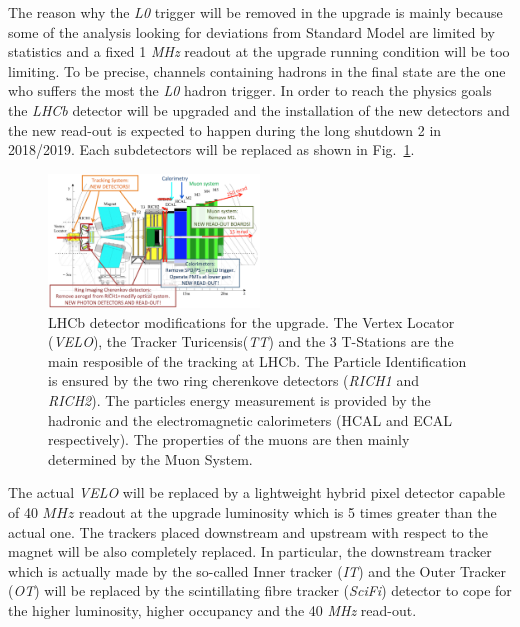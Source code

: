 \documentclass[paper=a4, fontsize=10pt]{scrartcl}
\numberwithin{equation}{section}		%
\numberwithin{figure}{section}			%
\numberwithin{table}{section}				%
\begin{document}
The reason why the \textit{L0} trigger will be removed in the upgrade is mainly because some of the analysis looking for deviations from Standard Model are limited by statistics and a fixed 1 \textit{MHz} readout at the upgrade running condition will be too limiting. To be precise, channels containing hadrons in the final state are the one who suffers the most the \textit{L0} hadron trigger.
In order to reach the physics goals the \textit{LHCb} detector will be upgraded and the installation of the new detectors and the new read-out is expected to happen during the long shutdown 2 in 2018/2019.
Each subdetectors will be replaced as shown in Fig.~\ref{Fig:Upgrade}.
\begin{figure}[h]
  \begin{center}
    \includegraphics[width=0.5\textwidth]{Images/Upgrade.png} 
  \caption[Caption for track type]{LHCb detector modifications for the upgrade. The Vertex Locator (\textit{VELO}), the Tracker Turicensis(\textit{TT}) and the 3 T-Stations are the main resposible of the tracking at LHCb. The Particle Identification is ensured by the two ring cherenkove detectors (\textit{RICH1} and \textit{RICH2}). The particles energy measurement is provided by the hadronic and the electromagnetic calorimeters (HCAL and ECAL respectively). The properties of the muons are then mainly determined by the Muon System.}\label{Fig:Upgrade}
  \end{center}
\end{figure}

The actual \textit{VELO} will be replaced by a lightweight hybrid pixel detector capable of 40 $MHz$ readout at the upgrade luminosity which is 5 times greater than the actual one.
The trackers placed downstream and upstream with respect to the magnet will be also completely replaced. In particular, the downstream tracker which is actually made by the so-called Inner tracker (\textit{IT}) and the Outer Tracker (\textit{OT}) will be replaced by the scintillating fibre tracker (\textit{SciFi}) detector to cope for the higher luminosity, higher occupancy and the 40 \textit{MHz} read-out.
\end{document}
